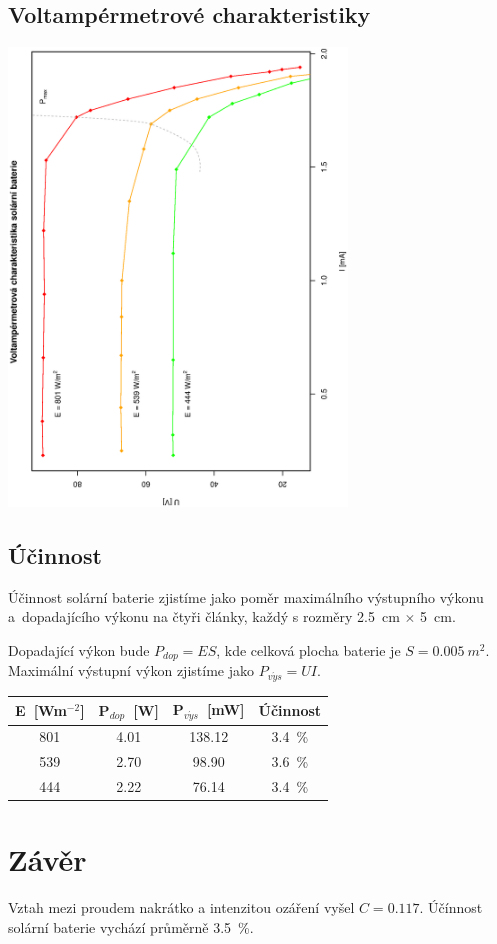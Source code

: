 \documentclass[10pt]{article}
\begin{document}
\subsection{Voltampérmetrové charakteristiky}
\begin{center}
\includegraphics[width=9cm,angle=270]{graf3.eps} \\[1cm]
\end{center}

\subsection{Účinnost}
Účinnost solární baterie zjistíme jako poměr maximálního výstupního výkonu 
a~dopadajícího výkonu na čtyři články, každý s rozměry 2.5~cm $\times$ 5~cm.

Dopadající výkon bude $P_{dop} = ES$, kde celková plocha baterie je $S =
0.005~m^2$. Maximální výstupní výkon zjistíme jako $P_{v\acute{y}s} = UI$.

\begin{center}
\begin{tabular}{|c|c|c|c|}
\hline
E~[Wm$^{-2}$] & P$_{dop}$~[W] & P$_{v\acute{y}s}$~[mW] & Účinnost \\
\hline
801 & 4.01 & 138.12 & 3.4~\% \\
539 & 2.70 & 98.90  & 3.6~\% \\
444 & 2.22 & 76.14  & 3.4~\% \\
\hline
\end{tabular}
\end{center}

\section{Závěr} 
Vztah mezi proudem nakrátko a intenzitou ozáření vyšel $C = 0.117$.
Účínnost solární baterie vychází průměrně 3.5~\%.
\end{document}
